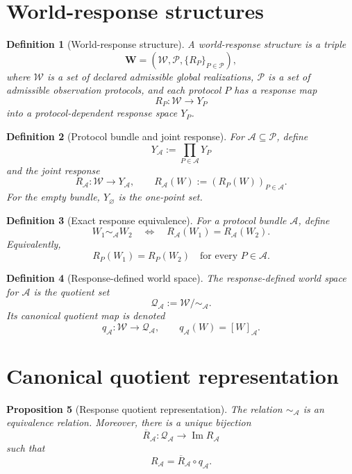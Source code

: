 \documentclass[11pt]{article}
\newtheorem{definition}{Definition}[section]
\newtheorem{proposition}[definition]{Proposition}
\newcommand{\W}{\mathcal W}
\newcommand{\Pcal}{\mathcal P}
\newcommand{\Acal}{\mathcal A}
\newcommand{\QA}{\mathcal Q_{\mathcal A}}
\newcommand{\RA}{R_{\mathcal A}}
\begin{document}
\section{World-response structures}

\begin{definition}[World-response structure]
A \emph{world-response structure} is a triple
\[
\mathbf W=(\W,\Pcal,\{R_P\}_{P\in\Pcal}),
\]
where $\W$ is a set of declared admissible global realizations, $\Pcal$ is a set
of admissible observation protocols, and each protocol $P$ has a response map
\[
R_P:\W\to Y_P
\]
into a protocol-dependent response space $Y_P$.
\end{definition}

\begin{definition}[Protocol bundle and joint response]
For $\Acal\subseteq\Pcal$, define
\[
Y_{\Acal}:=\prod_{P\in\Acal}Y_P
\]
and the joint response
\[
\RA:\W\to Y_{\Acal},
\qquad
\RA(W):=(R_P(W))_{P\in\Acal}.
\]
For the empty bundle, $Y_{\varnothing}$ is the one-point set.
\end{definition}

\begin{definition}[Exact response equivalence]
For a protocol bundle $\Acal$, define
\[
W_1\sim_{\Acal}W_2
\quad\Longleftrightarrow\quad
\RA(W_1)=\RA(W_2).
\]
Equivalently,
\[
R_P(W_1)=R_P(W_2)
\quad\text{for every }P\in\Acal.
\]
\end{definition}

\begin{definition}[Response-defined world space]
The \emph{response-defined world space} for $\Acal$ is the quotient set
\[
\QA:=\W/\!\sim_{\Acal}.
\]
Its canonical quotient map is denoted
\[
q_{\Acal}:\W\to\QA,
\qquad
q_{\Acal}(W)=[W]_{\Acal}.
\]
\end{definition}

\section{Canonical quotient representation}

\begin{proposition}[Response quotient representation]
The relation $\sim_{\Acal}$ is an equivalence relation.  Moreover, there is a
unique bijection
\[
\overline R_{\Acal}:\QA\longrightarrow \operatorname{Im}\RA
\]
such that
\[
\RA=\overline R_{\Acal}\circ q_{\Acal}.
\]
\end{proposition}
\end{document}
